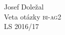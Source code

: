 \documentclass[20pt]{extarticle}
\begin{document}
\begin{center}

\vspace*{\fill}
\Large Josef Doležal\\[1cm]
\normalsize Veta otázky \textsc{bi-ag2}\\
\normalsize LS 2016/17
\normalsize





\end{center}
\end{document}
